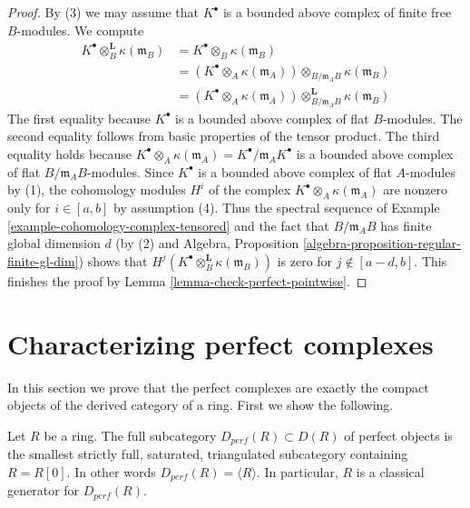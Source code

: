 \begin{proof}
By (3) we may assume that $K^\bullet$ is a bounded above complex of finite free
$B$-modules. We compute
\begin{align*}
K^\bullet \otimes_B^{\mathbf{L}} \kappa(\mathfrak m_B)
& = K^\bullet \otimes_B \kappa(\mathfrak m_B) \\
& = (K^\bullet \otimes_A \kappa(\mathfrak m_A))
\otimes_{B/\mathfrak m_A B} \kappa(\mathfrak m_B) \\
& = (K^\bullet \otimes_A \kappa(\mathfrak m_A))
\otimes^{\mathbf{L}}_{B/\mathfrak m_A B} \kappa(\mathfrak m_B)
\end{align*}
The first equality because $K^\bullet$ is a bounded above complex
of flat $B$-modules. The second equality follows from basic 
properties of the tensor product. The third equality holds because
$K^\bullet \otimes_A \kappa(\mathfrak m_A) =
K^\bullet/ \mathfrak m_A K^\bullet$ is a bounded above complex
of flat $B/\mathfrak m_A B$-modules. Since $K^\bullet$ is a bounded
above complex of flat $A$-modules by (1), the cohomology modules $H^i$
of the complex $K^\bullet \otimes_A \kappa(\mathfrak m_A)$ are nonzero only
for $i \in [a, b]$ by assumption (4). Thus the spectral sequence
of Example \ref{example-cohomology-complex-tensored} and the
fact that $B/\mathfrak m_AB$ has finite global dimension $d$
(by (2) and
Algebra, Proposition \ref{algebra-proposition-regular-finite-gl-dim})
shows that $H^j(K^\bullet \otimes_B^{\mathbf{L}} \kappa(\mathfrak m_B))$
is zero for $j \not \in [a - d, b]$.
This finishes the proof by Lemma \ref{lemma-check-perfect-pointwise}.
\end{proof}





\section{Characterizing perfect complexes}
\label{section-perfect-compact}

\noindent
In this section we prove that the perfect complexes are exactly the
compact objects of the derived category of a ring. First we show
the following.

\begin{lemma}
\label{lemma-perfect-ring-classical-generator}
Let $R$ be a ring. The full subcategory $D_{perf}(R) \subset D(R)$ of perfect
objects is the smallest strictly full, saturated, triangulated subcategory
containing $R = R[0]$. In other words $D_{perf}(R) = \langle R \rangle$.
In particular, $R$ is a classical generator for $D_{perf}(R)$.
\end{lemma}

